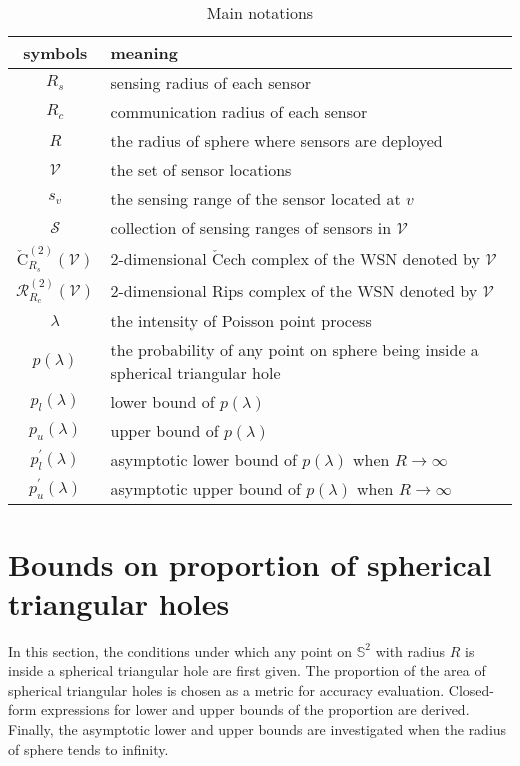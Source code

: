 \documentclass[journal, twoside]{IEEEtran}
\begin{document}
\begin{table}[ht]
\caption{Main notations}
\label{tabnot}
\centering
\begin{tabular}{|c|p{6cm}|}
\hline
\bfseries symbols & \bfseries meaning\\
\hline
$R_s$ & sensing radius of each sensor\\ \hline
$R_c$ & communication radius of each sensor \\ \hline
$R$ & the radius of sphere where sensors are deployed\\\hline
$\mathcal{V}$ & the set of sensor locations \\ \hline
$s_v$ & the sensing range of the sensor located at $v$ \\ \hline
$\mathcal{S}$ & collection of sensing ranges of sensors in $\mathcal{V}$ \\ \hline
$\check{\textrm{C}}_{R_s}^{(2)}(\mathcal{V})$ & 2-dimensional  $\check{\textrm{C}}$ech complex of the WSN denoted by $\mathcal{V}$ \\ \hline
$\mathcal{R}_{R_c}^{(2)}(\mathcal{V})$ & 2-dimensional Rips complex of the WSN denoted by $\mathcal{V}$ \\ \hline
$\lambda$ & the intensity of Poisson point process \\ \hline
$p(\lambda)$ & the probability of any point on sphere being inside a spherical triangular hole \\\hline
$p_l(\lambda)$ & lower bound of $p(\lambda)$ \\ \hline
$p_u(\lambda)$ & upper bound of $p(\lambda)$ \\ \hline
$p_l^\prime(\lambda)$ & asymptotic lower bound of $p(\lambda)$ when $R \to \infty$\\ \hline
$p_u^\prime(\lambda)$ & asymptotic upper bound of $p(\lambda)$ when $R \to \infty$ \\ \hline
\end{tabular}
\end{table}

\section{Bounds on proportion of spherical triangular holes} \label{secbound}

In this section, the conditions under which any point on $\mathbb{S}^2$ with radius $R$
is inside a spherical triangular hole are first given. The proportion of the area of spherical
triangular holes is chosen as a metric for accuracy evaluation. Closed-form
expressions for lower and upper bounds of the proportion are derived. 
Finally, the asymptotic lower and upper bounds are investigated when the 
radius of sphere tends to infinity.
\end{document}
